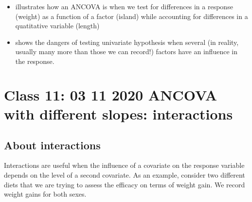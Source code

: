 \documentclass[
]{book}
\providecommand{\tightlist}{%
  \setlength{\itemsep}{0pt}\setlength{\parskip}{0pt}}
\begin{document}
\begin{itemize}
\tightlist
\item
  illustrates how an ANCOVA is when we test for differences in a response (weight) as a function of a factor (island) while accounting for differences in a quatitative variable (length)
\item
  shows the dangers of testing univariate hypothesis when several (in reality, usually many more than those we can record!) factors have an influence in the response.
\end{itemize}

\hypertarget{aula11}{%
\chapter{Class 11: 03 11 2020 ANCOVA with different slopes: interactions}\label{aula11}}

\hypertarget{about-interactions}{%
\section{About interactions}\label{about-interactions}}

Interactions are useful when the influence of a covariate on the response variable depends on the level of a second covariate. As an example, consider two different diets that we are trying to assess the efficacy on terms of weight gain. We record weight gains for both sexes.
\end{document}
